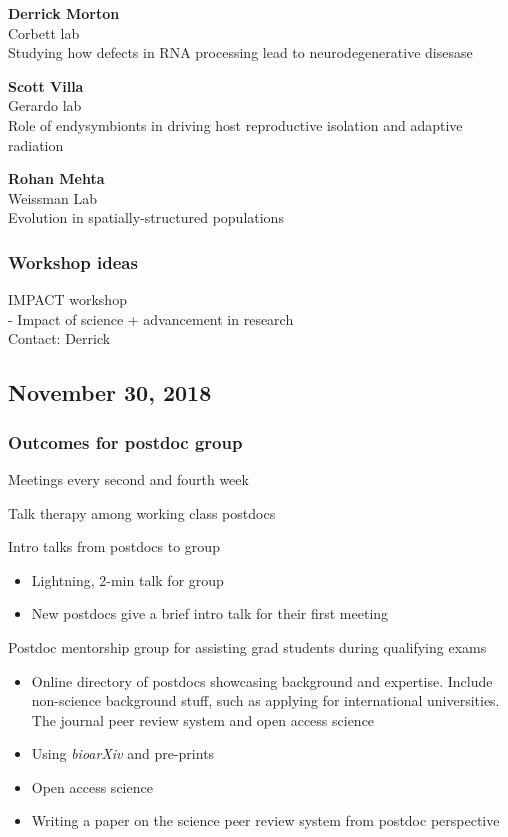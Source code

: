 \documentclass[10,portrait]{article}
\begin{document}
\textbf{Derrick Morton}\\
Corbett lab\\
Studying how defects in RNA processing lead to neurodegenerative
disesase

\textbf{Scott Villa}\\
Gerardo lab\\
Role of endysymbionts in driving host reproductive isolation and
adaptive radiation

\textbf{Rohan Mehta}\\
Weissman Lab\\
Evolution in spatially-structured populations

\subsubsection{Workshop ideas}\label{workshop-ideas}

IMPACT workshop\\
- Impact of science + advancement in research\\
Contact: Derrick

\newpage  

\subsection{November 30, 2018}\label{november-30-2018}

\subsubsection{Outcomes for postdoc
group}\label{outcomes-for-postdoc-group}

Meetings every second and fourth week

Talk therapy among working class postdocs

Intro talks from postdocs to group

\begin{itemize}
\item
  Lightning, 2-min talk for group
\item
  New postdocs give a brief intro talk for their first meeting
\end{itemize}

Postdoc mentorship group for assisting grad students during qualifying
exams

\begin{itemize}
\item
  Online directory of postdocs showcasing background and expertise.
  Include non-science background stuff, such as applying for
  international universities.\\
  The journal peer review system and open access science
\item
  Using \emph{bioarXiv} and pre-prints\\
\item
  Open access science\\
\item
  Writing a paper on the science peer review system from postdoc
  perspective
\end{itemize}
\end{document}
